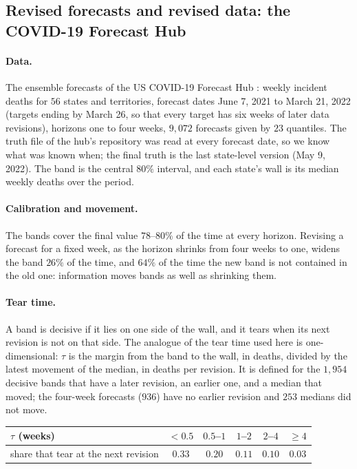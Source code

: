 \documentclass[11pt]{article}
\theoremstyle{definition}
\theoremstyle{remark}
\begin{document}
\subsection{Revised forecasts and revised data: the COVID-19 Forecast Hub}\label{sec:fhub}

\paragraph{Data.} The ensemble forecasts of the US COVID-19 Forecast Hub \cite{Cramer2022}: weekly incident deaths for $56$ states
and territories, forecast dates June 7, 2021 to March 21, 2022 (targets ending by March 26, so that every target has six weeks of
later data revisions), horizons one to four weeks, $9{,}072$ forecasts given by $23$ quantiles. The truth file of the hub's repository was read at every forecast date, so we know what was known when; the final
truth is the last state-level version (May 9, 2022). The band is the central $80\%$ interval, and each state's wall is its median
weekly deaths over the period.

\paragraph{Calibration and movement.} The bands cover the final value $78$--$80\%$ of the time at every horizon. Revising a forecast
for a fixed week, as the horizon shrinks from four weeks to one, widens the band $26\%$ of the time, and $64\%$ of the time the new
band is not contained in the old one: information moves bands as well as shrinking them.

\paragraph{Tear time.} A band is decisive if it lies on one side of the wall, and it tears when its next revision is not on that side.
The analogue of the tear time used here is one-dimensional: $\tau$ is the margin from the band to the wall, in deaths, divided by
the latest movement of the median, in deaths per revision. It is defined for the $1{,}954$ decisive bands that have a later revision,
an earlier one, and a median that moved; the four-week forecasts ($936$) have no earlier revision and $253$ medians did not move.

\begin{center}
\begin{tabular}{lccccc}
\toprule
$\tau$ (weeks) & $<0.5$ & $0.5$--$1$ & $1$--$2$ & $2$--$4$ & $\ge4$\\
\midrule
share that tear at the next revision & $0.33$ & $0.20$ & $0.11$ & $0.10$ & $0.03$\\
\bottomrule
\end{tabular}
\end{center}
\end{document}
